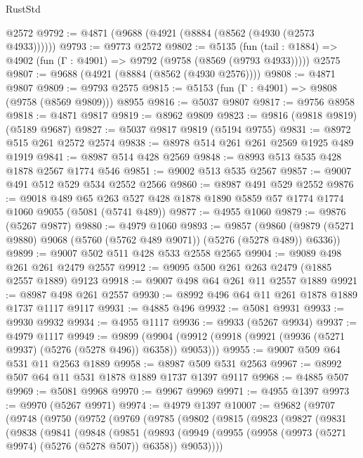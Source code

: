 \begin{lexlean}{RustStd}
\begin{coremodule}
{\begin{coremodule}
{{{{{{{{{{{{{{{{{{{{{{{{{{{{{    @2572
@9792 := @4871 (@9688 (@4921 (@8884 (@8562 (@4930 (@2573 @4933))))))
@9793 := @9773 @2572
@9802 := @5135
    (fun (tail : @1884) => @4902 (fun (Γ : @4901) => @9792 (@9758 (@8569 (@9793 @4933)))))
    @2575
@9807 := @9688 (@4921 (@8884 (@8562 (@4930 @2576))))
@9808 := @4871 @9807
@9809 := @9793 @2575
@9815 := @5153 (fun (Γ : @4901) => @9808 (@9758 (@8569 @9809))) @8955
@9816 := @5037 @9807
@9817 := @9756 @8958
@9818 := @4871 @9817
@9819 := @8962 @9809
@9823 := @9816 (@9818 @9819) (@5189 @9687)
@9827 := @5037 @9817 @9819 (@5194 @9755)
@9831 := @8972 @515 @261 @2572 @2574
@9838 := @8978 @514 @261 @261 @2569 @1925 @489 @1919
@9841 := @8987 @514 @428 @2569
@9848 := @8993 @513 @535 @428 @1878 @2567 @1774 @546
@9851 := @9002 @513 @535 @2567
@9857 := @9007 @491 @512 @529 @534 @2552 @2566
@9860 := @8987 @491 @529 @2552
@9876 := @9018
    @489
    @65
    @263
    @527
    @428
    @1878
    @1890
    @5859
    @57
    @1774
    @1774
    @1060
    @9055
    (@5081 (@5741 @489))
@9877 := @4955 @1060
@9879 := @9876 (@5267 @9877)
@9880 := @4979 @1060
@9893 := @9857
    (@9860 (@9879 (@5271 @9880) @9068 (@5760 (@5762 @489 @9071)) (@5276 (@5278 @489)) @6336))
@9899 := @9007 @502 @511 @428 @533 @2558 @2565
@9904 := @9089 @498 @261 @261 @2479 @2557
@9912 := @9095 @500 @261 @263 @2479 (@1885 @2557 @1889) @9123
@9918 := @9007 @498 @64 @261 @11 @2557 @1889
@9921 := @8987 @498 @261 @2557
@9930 := @8992 @496 @64 @11 @261 @1878 @1889 @1737 @1117 @9117
@9931 := @4885 @496
@9932 := @5081 @9931
@9933 := @9930 @9932
@9934 := @4955 @1117
@9936 := @9933 (@5267 @9934)
@9937 := @4979 @1117
@9949 := @9899
    (@9904 (@9912 (@9918 (@9921 (@9936 (@5271 @9937) (@5276 (@5278 @496)) @6358)) @9053)))
@9955 := @9007 @509 @64 @531 @11 @2563 @1889
@9958 := @8987 @509 @531 @2563
@9967 := @8992 @507 @64 @11 @531 @1878 @1889 @1737 @1397 @9117
@9968 := @4885 @507
@9969 := @5081 @9968
@9970 := @9967 @9969
@9971 := @4955 @1397
@9973 := @9970 (@5267 @9971)
@9974 := @4979 @1397
@10007 := @9682
    (@9707
      (@9748
        (@9750
          (@9752
            (@9769
              (@9785
                (@9802
                  (@9815
                    (@9823
                      (@9827
                        (@9831
                          (@9838
                            (@9841
                              (@9848
                                (@9851
                                  (@9893
                                    (@9949
                                      (@9955
                                        (@9958 (@9973 (@5271 @9974) (@5276 (@5278 @507)) @6358))
                                        @9053))))
}}}}}}}}}}}}}}}}}}}}}}}}}}}}}
\end{coremodule}}
\end{coremodule}
\end{lexlean}
